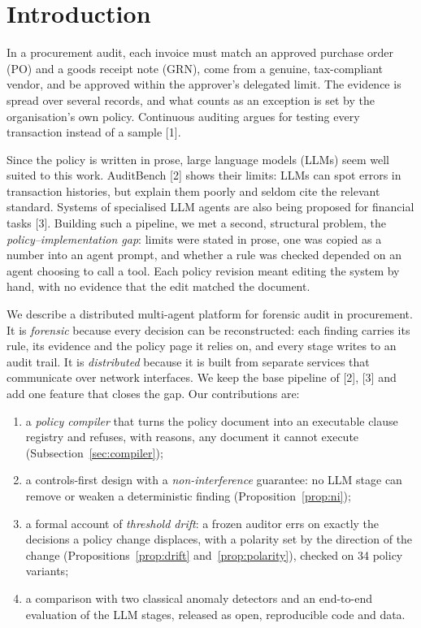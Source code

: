 \documentclass[9pt,a4paper,twocolumn]{extarticle}
\begin{document}
\section{Introduction}
In a procurement audit, each invoice must match an approved purchase order (PO) and a goods receipt note (GRN), come from a genuine, tax-compliant vendor, and be approved within the approver's delegated limit. The evidence is spread over several records, and what counts as an exception is set by the organisation's own policy. Continuous auditing argues for testing every transaction instead of a sample [1].

Since the policy is written in prose, large language models (LLMs) seem well suited to this work. AuditBench [2] shows their limits: LLMs can spot errors in transaction histories, but explain them poorly and seldom cite the relevant standard. Systems of specialised LLM agents are also being proposed for financial tasks [3]. Building such a pipeline, we met a second, structural problem, the \emph{policy--implementation gap}: limits were stated in prose, one was copied as a number into an agent prompt, and whether a rule was checked depended on an agent choosing to call a tool. Each policy revision meant editing the system by hand, with no evidence that the edit matched the document.

We describe a distributed multi-agent platform for forensic audit in procurement. It is \emph{forensic} because every decision can be reconstructed: each finding carries its rule, its evidence and the policy page it relies on, and every stage writes to an audit trail. It is \emph{distributed} because it is built from separate services that communicate over network interfaces. We keep the base pipeline of [2], [3] and add one feature that closes the gap. Our contributions are:
\begin{enumerate}\setlength{\itemsep}{0pt}\setlength{\parsep}{0pt}\setlength{\topsep}{2pt}
\item a \emph{policy compiler} that turns the policy document into an executable clause registry and refuses, with reasons, any document it cannot execute (Subsection~\ref{sec:compiler});
\item a controls-first design with a \emph{non-interference} guarantee: no LLM stage can remove or weaken a deterministic finding (Proposition~\ref{prop:ni});
\item a formal account of \emph{threshold drift}: a frozen auditor errs on exactly the decisions a policy change displaces, with a polarity set by the direction of the change (Propositions~\ref{prop:drift} and~\ref{prop:polarity}), checked on 34 policy variants;
\item a comparison with two classical anomaly detectors and an end-to-end evaluation of the LLM stages, released as open, reproducible code and data.
\end{enumerate}
\end{document}
